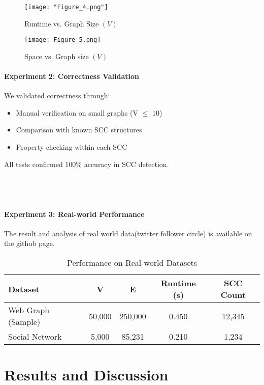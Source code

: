 \documentclass{book}
\theoremstyle{definition}
\begin{document}
\begin{figure}[h]
\centering
\texttt{[image: "Figure\_4.png"]} 
\caption{Runtime vs. Graph Size $(V)$} 
\end{figure}

\begin{figure}[h]
\centering
\texttt{[image: Figure\_5.png]}
\caption{Space vs. Graph size $(V)$}
\end{figure}


\newpage

\subsubsection{Experiment 2: Correctness Validation}

We validated correctness through:
\begin{itemize}
    \item Manual verification on small graphs (V $\leq$ 10)
    \item Comparison with known SCC structures
    \item Property checking within each SCC
\end{itemize}

All tests confirmed 100\% accuracy in SCC detection.
\\\\\\\\

\subsubsection{Experiment 3: Real-world Performance}
The result and analysis of real world data(twitter follower circle) is available on the github page.
\begin{table}[h]
\centering
\begin{tabular}{lcccc}
\toprule
\textbf{Dataset} & \textbf{V} & \textbf{E} & \textbf{Runtime (s)} & \textbf{SCC Count} \\
\midrule
Web Graph (Sample) & 50,000 & 250,000 & 0.450 & 12,345 \\
Social Network & 5,000 & 85,231 & 0.210 & 1,234 \\
\bottomrule
\end{tabular}
\caption{Performance on Real-world Datasets}
\end{table}

\chapter{Results and Discussion}
\end{document}
